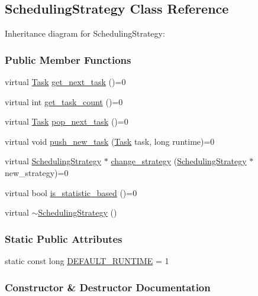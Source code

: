 \hypertarget{a00076}{}\subsection{Scheduling\+Strategy Class Reference}
\label{a00076}


Inheritance diagram for Scheduling\+Strategy\+:
\subsubsection*{Public Member Functions}
\begin{DoxyCompactItemize}
\item 
virtual \hyperlink{a00002}{Task} \hyperlink{a00076_adce3619801460ad67d6c8f9bdffcd36b}{get\+\_\+next\+\_\+task} ()=0
\item 
virtual int \hyperlink{a00076_a0a3355ffe9c03236692ad00e4f94f5c5}{get\+\_\+task\+\_\+count} ()=0
\item 
virtual \hyperlink{a00002}{Task} \hyperlink{a00076_ac2ba483287c91fd4318f337da144a9c5}{pop\+\_\+next\+\_\+task} ()=0
\item 
virtual void \hyperlink{a00076_a62ffa0426528c14fdd0b0853f04a851f}{push\+\_\+new\+\_\+task} (\hyperlink{a00002}{Task} task, long runtime)=0
\item 
virtual \hyperlink{a00076}{Scheduling\+Strategy} $\ast$ \hyperlink{a00076_a4874d194c1bb185480339360fe907d83}{change\+\_\+strategy} (\hyperlink{a00076}{Scheduling\+Strategy} $\ast$new\+\_\+strategy)=0
\item 
virtual bool \hyperlink{a00076_a5962845ca5af53bbdc014c19a6bdef99}{is\+\_\+statistic\+\_\+based} ()=0
\item 
virtual \hyperlink{a00076_a896eb08aa462cd1ecaa59ca02c7c0c58}{$\sim$\+Scheduling\+Strategy} ()
\end{DoxyCompactItemize}
\subsubsection*{Static Public Attributes}
\begin{DoxyCompactItemize}
\item 
static const long \hyperlink{a00076_acc0ddb05e5c6f21bd0e82a9e89a23ccb}{D\+E\+F\+A\+U\+L\+T\+\_\+\+R\+U\+N\+T\+I\+M\+E} = 1
\end{DoxyCompactItemize}


\subsubsection{Constructor \& Destructor Documentation}
\hypertarget{a00076_a896eb08aa462cd1ecaa59ca02c7c0c58}{}
